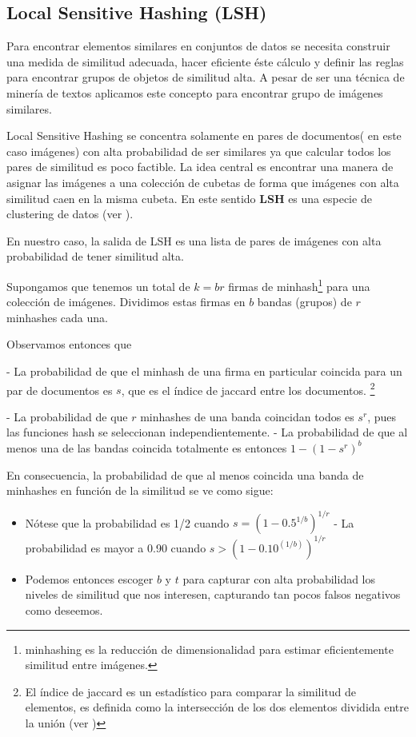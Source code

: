 \subsection{ Local Sensitive Hashing (LSH)}

Para encontrar elementos similares en conjuntos de datos se necesita construir una medida de similitud adecuada, hacer eficiente éste cálculo y definir las reglas para encontrar grupos de objetos de similitud alta. A pesar de ser una técnica de minería de textos aplicamos este concepto para encontrar grupo de imágenes similares. 

Local Sensitive Hashing se concentra solamente en pares de documentos( en este caso imágenes) con alta probabilidad de ser similares ya que calcular todos los pares de similitud es poco factible. La idea central es  encontrar una manera de asignar las imágenes a una colección de cubetas de forma que imágenes con alta similitud caen en la misma cubeta. En este sentido \textbf{LSH} es una especie de clustering de datos (ver \cite{leskovec2014mining}).

En nuestro caso, la salida de LSH es una lista de pares de imágenes con alta
probabilidad de tener similitud alta.


Supongamos que tenemos un total de $k=br$ firmas de minhash\footnote{ minhashing es la reducción de dimensionalidad para estimar eficientemente similitud entre imágenes.} para una colección de imágenes.
Dividimos estas firmas en $b$ bandas (grupos) de $r$ minhashes cada una.

Observamos entonces que

- La probabilidad de que el minhash de una firma en particular coincida para un par de
documentos es $s$, que es el índice de jaccard entre los documentos. \footnote{El índice de jaccard es un estadístico para comparar la similitud de elementos, es definida como la intersección de los dos elementos dividida entre la unión (ver \cite{leskovec2014mining})}

- La probabilidad de que $r$ minhashes de una banda coincidan todos es $s^r$, pues las
funciones hash se seleccionan independientemente.
- La probabilidad de que al menos una de las bandas coincida totalmente es entonces
$1-(1-s^r)^b$ 

En consecuencia, la probabilidad de que al menos coincida una banda de minhashes en
función de la similitud se ve como sigue:

\begin{itemize}

\item Nótese que la probabilidad es 1/2 cuando $s=(1-0.5^{1/b})^{1/r}$
- La probabilidad es mayor a 0.90 cuando $s >(1-0.10^{(1/b)})^{1/r}$
\item Podemos entonces escoger $b$ y $t$ para capturar con alta probabilidad los niveles
de similitud que nos interesen, capturando tan pocos falsos negativos como deseemos.

\end{itemize}



